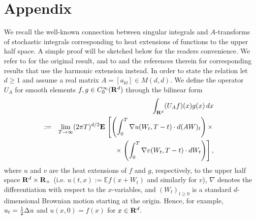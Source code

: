 \documentclass[11pt,a4paper,twoside,draft]{amsart}
\theoremstyle{definition}
\newcommand{\beqla}[1] {\begin {eqnarray}\label{#1}}
\def\eeq {\end {eqnarray}}
\newcommand{\real}{{\bf R}}
\newcommand{\smooth}{C^\infty}
\newcommand{\E}{\mathbb{E}}
\newcommand{\expec}{{{\mathbf E}\,}}
\begin{document}

\section{Appendix}\label{se:appendix}

We recall the well-known connection between 
singular integrals and $A$-transforms of stochastic integrals  corresponding 
to heat extensions of functions to the upper half space. A simple proof will be sketched 
below for the readers convenience. We refer to \cite{Ban2} for 
the original result, and to \cite{Bass} and the references therein for corresponding 
results that use the harmonic extension instead. In order 
to state the relation let $d\geq1$ and assume a real matrix 
$A=[a_{kl}]\in M(d,d)$.
We define the operator $U_A$ for smooth elements 
$f,g\in \smooth_0 (\real^d)$  through the bilinear form
\beqla{eq:A.100}
&   & \int_{\real^d} (U_Af)(x)g(x)\, dx \\
&:= & \lim_{T\to \infty}(2\pi T)^{d/2}\expec \left[\left(\int_{0}^{T} 
      \nabla  u(W_t, T-t)\cdot d(AW)_t \right)\times \right. \nonumber \\
&   & \qquad \times  \left. \left(\int_{0}^{T}
      \nabla  v(W_t, T-t)\cdot dW_t\right)\right] ,\nonumber 
\eeq
where $u$ and $v$ are the heat extensions of $f$ and $g$, respectively,
to the upper half space $\real^{d}\times \real_+ $ (i.e. $u(t,x) := \E f(x+W_t)$ and
similarly for $v$), $\nabla$ denotes the differentiation with respect to the $x$-variables, 
and $(W_t)_{t\ge 0}$ is a standard $d$-dimensional Brownian motion starting at the origin.
Hence, for example, $u_{t}={1\over 2}\Delta u$ and $u(x,0)=f(x)$ for
$x\in\real^d.$  
\bigskip
\end{document}

